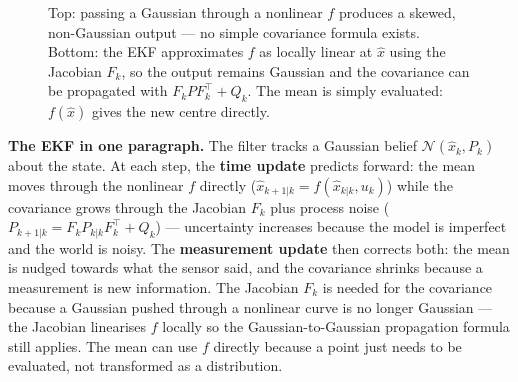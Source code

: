 \documentclass[12pt, a4paper]{article}
\begin{document}
\begin{figure}[H]
  \caption{Top: passing a Gaussian through a nonlinear $f$ produces a
           skewed, non-Gaussian output --- no simple covariance formula exists.
           Bottom: the EKF approximates $f$ as locally linear at $\hat{x}$
           using the Jacobian $F_k$, so the output remains Gaussian and
           the covariance can be propagated with $F_k P F_k^\top + Q_k$.
           The mean is simply evaluated: $f(\hat{x})$ gives the new centre
           directly.}
\end{figure}

\begin{keybox}
  \textbf{The EKF in one paragraph.}
  The filter tracks a Gaussian belief $\mathcal{N}(\hat{x}_k, P_k)$
  about the state.
  At each step, the \textbf{time update} predicts forward:
  the mean moves through the nonlinear $f$ directly
  ($\hat{x}_{k+1|k} = f(\hat{x}_{k|k}, u_k)$) while the covariance
  grows through the Jacobian $F_k$ plus process noise
  ($P_{k+1|k} = F_k P_{k|k} F_k^\top + Q_k$) --- uncertainty
  increases because the model is imperfect and the world is noisy.
  The \textbf{measurement update} then corrects both: the mean is
  nudged towards what the sensor said, and the covariance shrinks
  because a measurement is new information.
  The Jacobian $F_k$ is needed for the covariance because a Gaussian
  pushed through a nonlinear curve is no longer Gaussian --- the
  Jacobian linearises $f$ locally so the Gaussian-to-Gaussian
  propagation formula still applies.
  The mean can use $f$ directly because a point just needs to be
  evaluated, not transformed as a distribution.
\end{keybox}
\end{document}
